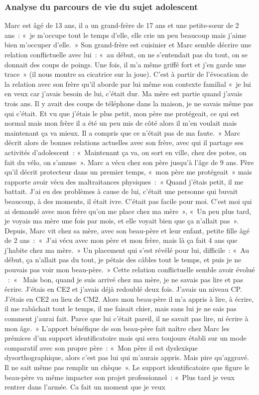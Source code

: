 \documentclass[12pt, a4paper]{book}
\begin{document}
\begin{spacing}{1.5}
\subsubsection{Analyse du parcours de vie du sujet adolescent}

Marc est âgé de 13 ans, il a un  grand-frère de 17 ans et une petite-sœur de 2 ans : « je m'occupe tout le temps d'elle, elle crie un peu beaucoup mais j'aime bien m'occuper d'elle. » Son grand-frère est cuisinier et Marc semble décrire une relation conflictuelle avec lui : « au début, on ne s'entendait pas du tout, on se donnait des coups de poings. Une fois, il m'a même griffé fort et j'en garde une trace » (il nous montre sa cicatrice sur la joue). C'est à partir de l'évocation de la relation avec son frère qu'il aborde par lui même son contexte familial « je lui en veux car j'avais besoin de lui, c'était dur. Ma mère est partie quand j'avais trois ans. Il y avait des coups de téléphone dans la maison, je ne savais même pas qui c'était. Et vu que j'étais le plus petit, mon père me protégeait, ce qui est normal mais mon frère il a été un peu mis de côté alors il m'en voulait mais maintenant ça va mieux. Il a compris que ce n'était pas de ma faute. » Marc décrit alors de bonnes relations actuelles avec son frère, avec qui il partage ses activités d'adolescent : « Maintenant ça va, on sort en ville, chez des potes, on fait du vélo, on s'amuse ». Marc a vécu chez son père jusqu'à l'âge de 9 ans. Père qu'il décrit protecteur dans un premier temps, « mon père me protégeait » mais rapporte avoir vécu des maltraitances physiques : « Quand j'étais petit, il me battait. J'ai eu des problèmes à cause de lui, c'était une personne qui buvait beaucoup, à des moments, il était ivre. C'était pas facile pour moi. C'est moi qui ai demandé avec mon frère qu'on me place chez ma mère », « Un peu plus tard, je voyais ma mère une fois par mois, et elle voyait bien que ça n'allait pas ».  Depuis, Marc vit chez sa mère, avec son beau-père et leur enfant, petite fille âgé de 2 ans : « J'ai vécu avec mon père et mon frère, mais là ça fait 4 ans que j'habite chez ma mère. » Un placement qui s'est révélé pour lui, difficile : « Au début, ça n'allait pas du tout, je pétais des câbles tout le temps, et puis je ne pouvais pas voir mon beau-père. » Cette relation conflictuelle semble avoir évolué  : «  Mais bon, quand je suis arrivé chez ma mère, je ne savais pas lire et pas écrire. J'étais en CE2 et j'avais déjà redoublé deux fois. J'avais un niveau CP. J'étais en CE2 au lieu de CM2. Alors mon beau-père il m'a appris à lire, à écrire, il me rabâchait tout le temps, il me faisait chier, mais sans lui je ne sais pas comment j'aurai fait. Parce que lui c'était pareil, il ne savait pas lire, ni écrire à mon âge. » L'apport bénéfique de son beau-père fait naître chez Marc les prémices d'un support identificatoire mais qui sera toujours établi sur un mode comparatif avec son propre père : « Mon père il est dyslexique dysorthographique, alors c'est pas lui qui m'aurais appris. Mais pire qu'aggravé. Il ne sait même pas remplir un chèque ». Le support identificatoire que figure le beau-père va même impacter son projet professionnel : « Plus tard je veux rentrer dans l'armée. Ca fait un moment que je veux 
\end{spacing}
\end{document}
